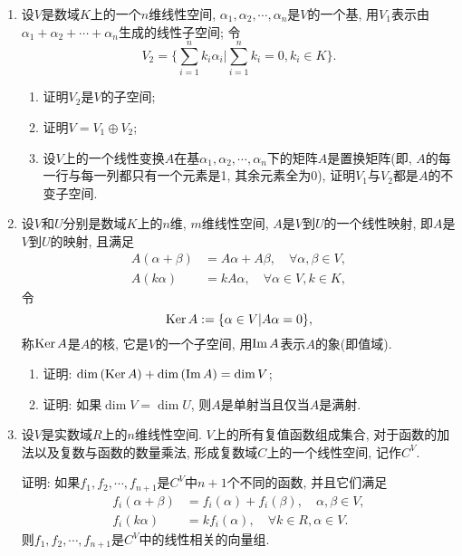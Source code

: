 \documentclass[12pt,a4paper,openany]{book}
\newcommand\Ker{\text{Ker\,}}
\newcommand\Image{\text{Im\,}}
\begin{document}
\begin{enumerate}
\item 设$V$是数域$K$上的一个$n$维线性空间, $\alpha_1, \alpha_2, \cdots, \alpha_n$是$V$的一个基, 用$V_1$表示由$\alpha_1 + \alpha_2 + \cdots + \alpha_n$生成的线性子空间; 令
\[
V_2 = \{ \sum_{i=1}^{n}{k_i\alpha_i} | \sum_{i=1}^{n}{k_i} = 0, k_i \in K \}.
\]
\begin{enumerate}
\item 证明$V_2$是$V$的子空间;
\item 证明$V = V_1 \oplus V_2$;
\item 设$V$上的一个线性变换$A$在基$\alpha_1, \alpha_2, \cdots, \alpha_n$下的矩阵$A$是置换矩阵(即, $A$的每一行与每一列都只有一个元素是1, 其余元素全为0), 证明$V_1$与$V_2$都是$A$的不变子空间.
\end{enumerate}

\item 设$V$和$U$分别是数域$K$上的$n$维, $m$维线性空间, $A$是$V$到$U$的一个线性映射, 即$A$是$V$到$U$的映射, 且满足
\[
\begin{aligned}
A(\alpha + \beta) &= A\alpha + A\beta, \quad \forall \alpha, \beta \in V, \\
A(k\alpha) &= kA\alpha, \quad \forall \alpha \in V, k \in K,
\end{aligned}
\]
令
\[
\Ker{A} := \{ \alpha \in V | A\alpha = 0 \},
\]
称$\Ker{A}$是$A$的核, 它是$V$的一个子空间, 用$\Image{A}$表示$A$的象(即值域).
\begin{enumerate}
\item 证明: $\dim{(\Ker{A})} + \dim{(\Image{A})} = \dim{V}$;
\item 证明: 如果$\dim{V} = \dim{U}$, 则$A$是单射当且仅当$A$是满射.
\end{enumerate}

\item 设$V$是实数域$R$上的$n$维线性空间. $V$上的所有复值函数组成集合, 对于函数的加法以及复数与函数的数量乘法, 形成复数域$C$上的一个线性空间, 记作$C^V$.

证明: 如果$f_1, f_2, \cdots, f_{n+1}$是$C^V$中$n+1$个不同的函数, 并且它们满足
\[
\begin{aligned}
f_i(\alpha + \beta) &= f_i(\alpha) + f_i(\beta), \quad \alpha, \beta \in V, \\
f_i(k\alpha) &= kf_i(\alpha), \quad \forall k \in R, \alpha \in V.
\end{aligned}
\]
则$f_1, f_2, \cdots, f_{n+1}$是$C^V$中的线性相关的向量组.
\end{enumerate}
\end{document}
